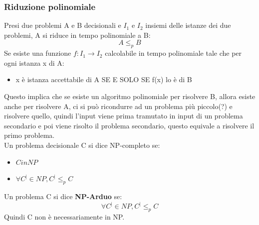 \documentclass[a4paper,12pt]{article}
\begin{document}
\subsubsection{Riduzione polinomiale}
Presi due problemi A e B decisionali e $I_1$ e $I_2$ insiemi delle istanze dei due problemi, A si riduce in tempo polinomiale a B:
\[
A \leq_p B
\]
Se esiste una funzione $f:I_1 \to I_2$ calcolabile in tempo polinomiale tale che per ogni istanza x di A:
\begin{itemize}
    \item x è istanza accettabile di A SE E SOLO SE f(x) lo è di B
\end{itemize}
Questo implica che se esiste un algoritmo polinomiale per risolvere B, allora esiste anche per risolvere A, ci si può ricondurre ad un problema più piccolo(?) e risolvere quello, quindi l'input viene prima tramutato in input di un problema secondario e poi viene risolto il problema secondario, questo equivale a risolvere il primo problema.\\
Un problema decisionale C si dice NP-completo se:
\begin{itemize}
    \item $C in NP$
    \item $\forall C^| \in NP, C^| \leq_p C$
\end{itemize}
Un problema C si dice \textbf{NP-Arduo} se:
\[
\forall C^| \in NP, C^| \leq_p C
\]
Quindi C non è necessariamente in NP.
\end{document}
